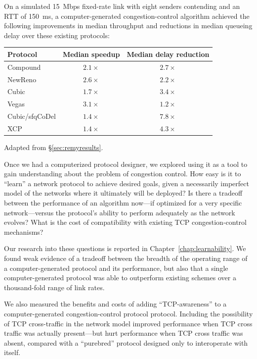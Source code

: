 On a simulated 15~Mbps fixed-rate link with eight senders contending and
an RTT of 150~ms, a computer-generated congestion-control algorithm
achieved the following improvements in median throughput and
reductions in median queueing delay over these existing protocols:

\begin{center}

\begin{tabular}{|l|c|c|}
\hline
Protocol & Median speedup & Median delay reduction \\
\hline
\hline
Compound & $2.1\times$ & $2.7\times$ \\
NewReno & $2.6\times$ & $2.2\times$ \\
Cubic & $1.7\times$ & $3.4\times$ \\
Vegas & $3.1\times$ & $1.2\times$ \\
\hline
Cubic/sfqCoDel & $1.4\times$ & $7.8\times$ \\
XCP & $1.4\times$ & $4.3\times$ \\
\hline
\end{tabular}

{\footnotesize Adapted from \S\ref{sec:remyresults}.}

\end{center}

Once we had a computerized protocol designer, we explored using it as
a tool to gain understanding about the problem of congestion control.
How easy is it to ``learn'' a network protocol to achieve desired
goals, given a necessarily imperfect model of the networks where it
ultimately will be deployed? Is there a tradeoff between the
performance of an algorithm now---if optimized for a very specific
network---versus the protocol's ability to perform adequately as the
network evolves? What is the cost of compatibility with existing TCP
congestion-control mechanisms?

Our research into these questions is reported in
Chapter~\ref{chap:learnability}. We found weak evidence of a tradeoff
between the breadth of the operating range of a computer-generated
protocol and its performance, but also that a single
computer-generated protocol was able to outperform existing schemes
over a thousand-fold range of link rates.

We also measured the benefits and costs of adding ``TCP-awareness'' to
a computer-generated congestion-control protocol protocol. Including
the possibility of TCP cross-traffic in the network model improved
performance when TCP cross traffic was actually present---but hurt
performance when TCP cross traffic was absent, compared with a
``purebred'' protocol designed only to interoperate with itself.

